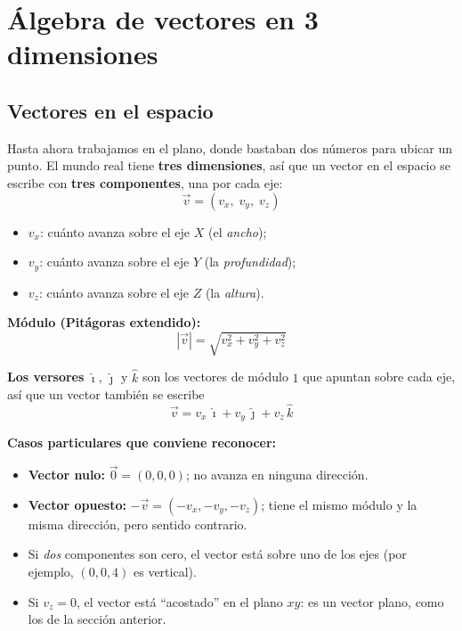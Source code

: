 \documentclass[12pt, letterpaper]{article}
\begin{document}
\newpage

\section{Álgebra de vectores en 3 dimensiones}

\subsection{Vectores en el espacio}

\begin{cuadroteoria}
  Hasta ahora trabajamos en el plano, donde bastaban dos números para ubicar un punto. El mundo real tiene \textbf{tres dimensiones}, así que un vector en el espacio se escribe con \textbf{tres componentes}, una por cada eje:
  $$\vec{v} = (v_x,\; v_y,\; v_z)$$
  \begin{itemize}[leftmargin=*]
    \item $v_x$: cuánto avanza sobre el eje $X$ (el \emph{ancho});
    \item $v_y$: cuánto avanza sobre el eje $Y$ (la \emph{profundidad});
    \item $v_z$: cuánto avanza sobre el eje $Z$ (la \emph{altura}).
  \end{itemize}

  \textbf{Módulo (Pitágoras extendido):}
  $$|\vec{v}| = \sqrt{v_x^2 + v_y^2 + v_z^2}$$

  \textbf{Los versores} $\hat{\imath}$, $\hat{\jmath}$ y $\hat{k}$ son los vectores de módulo $1$ que apuntan sobre cada eje, así que un vector también se escribe
  $$\vec{v} = v_x\,\hat{\imath} + v_y\,\hat{\jmath} + v_z\,\hat{k}$$
\end{cuadroteoria}

\begin{cuadroteoria}
  \textbf{Casos particulares que conviene reconocer:}
  \begin{itemize}[leftmargin=*]
    \item \textbf{Vector nulo:} $\vec{0} = (0, 0, 0)$; no avanza en ninguna dirección.
    \item \textbf{Vector opuesto:} $-\vec{v} = (-v_x, -v_y, -v_z)$; tiene el mismo módulo y la misma dirección, pero sentido contrario.
    \item Si \emph{dos} componentes son cero, el vector está sobre uno de los ejes (por ejemplo, $(0,0,4)$ es vertical).
    \item Si $v_z = 0$, el vector está ``acostado'' en el plano $xy$: es un vector plano, como los de la sección anterior.
  \end{itemize}
\end{cuadroteoria}
\end{document}
